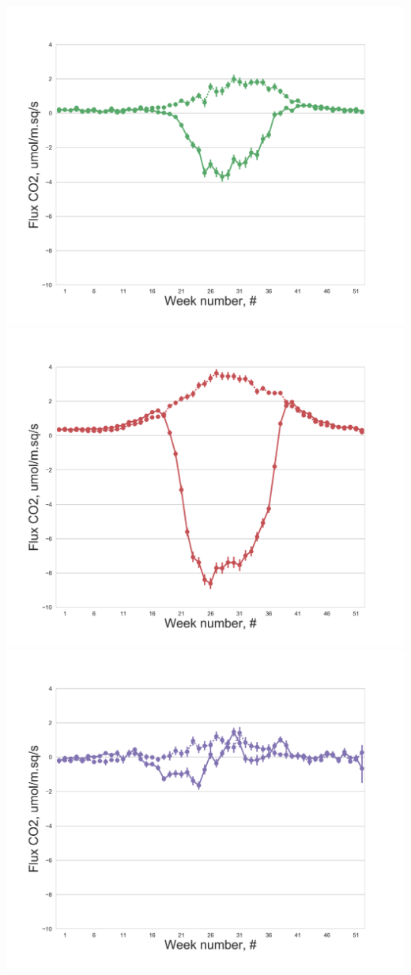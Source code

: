 \documentclass{beamer}
\begin{document}
\begin{frame}
\begin{columns}[t]
\includegraphics[width=\textwidth]{FvsW_day/CA-NS6.png}\\
\includegraphics[width=\textwidth]{FvsW_day/CA-Oas.png}
\centering
\includegraphics[width=\textwidth]{FvsW_day/US-FPe.png}\\

\end{columns}
\end{frame}
\end{document}
